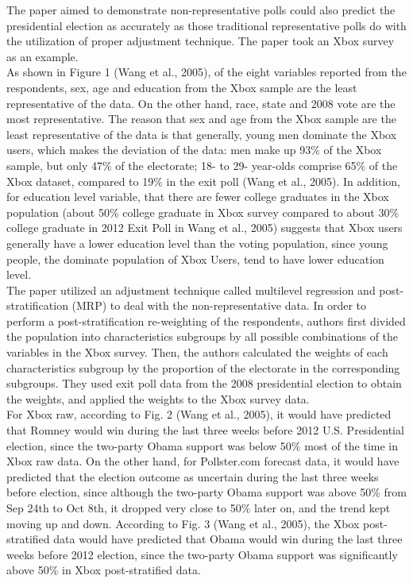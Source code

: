 \documentclass[12pt]{article}
\newcommand\tab[1][1cm]{\hspace*{#1}}
\begin{document}
\tab The paper aimed to demonstrate non-representative polls could also predict the presidential election as accurately as those traditional representative polls do with the utilization of proper adjustment technique. The paper took an Xbox survey as an example.\\
\tab As shown in Figure 1 (Wang et al., 2005), of the eight variables reported from the respondents, sex, age and education from the Xbox sample are the least representative of the data. On the other hand, race, state and 2008 vote are the most representative. The reason that sex and age from the Xbox sample are the least representative of the data is that generally, young men dominate the Xbox users, which makes the deviation of the data: men make up 93\% of the Xbox sample, but only 47\% of the electorate; 18- to 29- year-olds comprise 65\% of the Xbox dataset, compared to 19\% in the exit poll (Wang et al., 2005). In addition, for education level variable, that there are fewer college graduates in the Xbox population (about 50\% college graduate in Xbox survey compared to about 30\% college graduate in 2012 Exit Poll in Wang et al., 2005) suggests that Xbox users generally have a lower education level than the voting population, since young people, the dominate population of Xbox Users, tend to have lower education level.\\
\tab The paper utilized an adjustment technique called multilevel regression and post-stratification (MRP) to deal with the non-representative data. In order to perform a post-stratification re-weighting of the respondents, authors first divided the population into characteristics subgroups by all possible combinations of the variables in the Xbox survey. Then, the authors calculated the weights of each characteristics subgroup by the proportion of the electorate in the corresponding subgroups. They used exit poll data from the 2008 presidential election to obtain the weights, and applied the weights to the Xbox survey data.\\
\tab For Xbox raw, according to Fig. 2 (Wang et al., 2005), it would have predicted that Romney would win during the last three weeks before 2012 U.S. Presidential election, since the two-party Obama support was below 50\% most of the time in Xbox raw data. On the other hand, for Pollster.com forecast data, it would have predicted that the election outcome as uncertain during the last three weeks before election, since although the two-party Obama support was above 50\% from Sep 24th to Oct 8th, it dropped very close to 50\% later on, and the trend kept moving up and down.  According to Fig. 3 (Wang et al., 2005), the Xbox post-stratified data would have predicted that Obama would win during the last three weeks before 2012 election, since the two-party Obama support was significantly above 50\% in Xbox post-stratified data.
\end{document}
